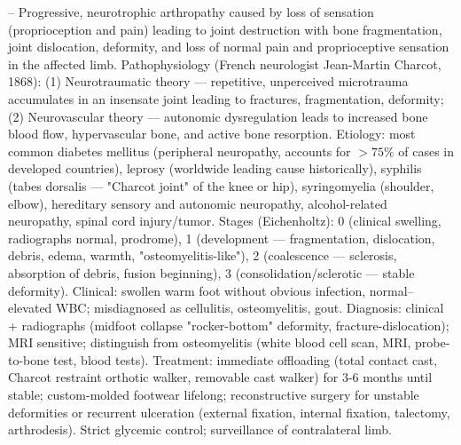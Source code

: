 -- Progressive, neurotrophic arthropathy caused by loss of sensation (proprioception and pain) leading to joint destruction with bone fragmentation, joint dislocation, deformity, and loss of normal pain and proprioceptive sensation in the affected limb. Pathophysiology (French neurologist Jean-Martin Charcot, 1868): (1) Neurotraumatic theory — repetitive, unperceived microtrauma accumulates in an insensate joint leading to fractures, fragmentation, deformity; (2) Neurovascular theory — autonomic dysregulation leads to increased bone blood flow, hypervascular bone, and active bone resorption. Etiology: most common diabetes mellitus (peripheral neuropathy, accounts for $> 75\%$ of cases in developed countries), leprosy (worldwide leading cause historically), syphilis (tabes dorsalis — "Charcot joint" of the knee or hip), syringomyelia (shoulder, elbow), hereditary sensory and autonomic neuropathy, alcohol-related neuropathy, spinal cord injury/tumor. Stages (Eichenholtz): 0 (clinical swelling, radiographs normal, prodrome), 1 (development — fragmentation, dislocation, debris, edema, warmth, "osteomyelitis-like"), 2 (coalescence — sclerosis, absorption of debris, fusion beginning), 3 (consolidation/sclerotic — stable deformity). Clinical: swollen warm foot without obvious infection, normal–elevated WBC; misdiagnosed as cellulitis, osteomyelitis, gout. Diagnosis: clinical + radiographs (midfoot collapse "rocker-bottom" deformity, fracture-dislocation); MRI sensitive; distinguish from osteomyelitis (white blood cell scan, MRI, probe-to-bone test, blood tests). Treatment: immediate offloading (total contact cast, Charcot restraint orthotic walker, removable cast walker) for 3-6 months until stable; custom-molded footwear lifelong; reconstructive surgery for unstable deformities or recurrent ulceration (external fixation, internal fixation, talectomy, arthrodesis). Strict glycemic control; surveillance of contralateral limb.

